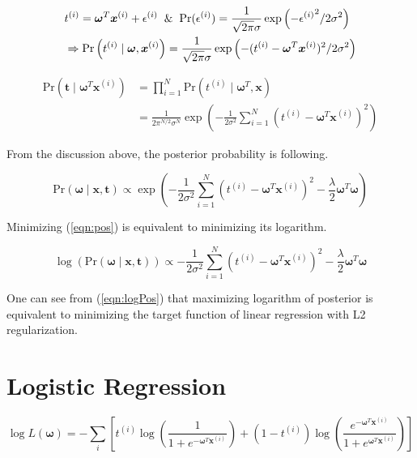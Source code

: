 \documentclass[12pt]{article}
\begin{document}
\begin{align*}
    &t^{(i)} = \boldsymbol{\omega}^T \boldsymbol{x}^{(i)} + \epsilon^{(i)} \And
    \text{Pr}(\epsilon^{(i)}) = \frac{1}{\sqrt{2\pi}\sigma}\exp\left( -{\epsilon^{(i)}}^2/2\sigma^2\right) \\ &\Rightarrow \text{Pr}\left(t^{(i)}\;|\;\boldsymbol{\omega}, \boldsymbol{x}^{(i)}\right) = \frac{1}{\sqrt{2\pi}\sigma} \exp\left(-(t^{(i)} - \boldsymbol{\omega}^T\boldsymbol{x}^{(i)})^2/2\sigma^2\right)
\end{align*}

\begin{align*}
    \text{Pr}(\boldsymbol{t}\;|\; \boldsymbol{\omega}^T \boldsymbol{x}^{(i)}) &= \prod_{i=1}^N\text{Pr}(t^{(i)}\;|\;\boldsymbol{\omega}^T, \boldsymbol{x}) \\ &= \frac{1}{2\pi^{N/2}\sigma^N} \exp\left(-\frac{1}{2\sigma^2}\sum_{i=1}^N (t^{(i)} - \boldsymbol{\omega}^T \boldsymbol{x}^{(i)})^2\right)
\end{align*}

From the discussion above, the posterior probability is following. 

\begin{equation}
    \text{Pr}(\boldsymbol{\omega}\;|\;\boldsymbol{x},\boldsymbol{t}) \propto \exp\left(-\frac{1}{2\sigma^2} \sum_{i=1}^N \left(t^{(i)} - \boldsymbol{\omega}^T\boldsymbol{x}^{(i)} \right)^2 - \frac{\lambda}{2} \boldsymbol{\omega}^T\boldsymbol{\omega}\right)
    \label{eqn:pos}
\end{equation}

Minimizing (\ref{eqn:pos}) is equivalent to minimizing its logarithm.

\begin{equation}
    \log\left(\text{Pr}(\boldsymbol{\omega}\;|\;\boldsymbol{x},\boldsymbol{t})\right) \propto -\frac{1}{2\sigma^2}\sum_{i=1}^N\left(t^{(i)} - \boldsymbol{\omega}^T\boldsymbol{x}^{(i)}\right)^2 - \frac{\lambda}{2}\boldsymbol{\omega}^T\boldsymbol{\omega}
    \label{eqn:logPos}
\end{equation}

One can see from (\ref{eqn:logPos}) that maximizing logarithm of posterior is equivalent to minimizing the target function of linear regression with L2 regularization.

\section{Logistic Regression}
\begin{equation}
    \log{L(\boldsymbol{\omega})} = -\sum_i\left[ t^{(i)}\log{\left(\frac{1}{1+e^{-\boldsymbol{\omega}^T\boldsymbol{x}^{(i)}}}\right)} + (1-t^{(i)})\log\left(\frac{e^{-\boldsymbol{\omega}^T\boldsymbol{x}^{(i)}}}{1+e^{\boldsymbol{\omega}^T\boldsymbol{x}^{(i)}}}\right)\right]
    \label{eqn:MLE}
\end{equation}
\end{document}
